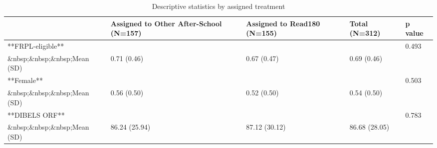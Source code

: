 \begin{table}

\caption{Descriptive statistics by assigned treatment \label{tab:descriptives}}
\centering
\begin{tabular}[t]{lllll}
\toprule
 & Assigned to Other After-School (N=157) & Assigned to Read180 (N=155) & Total (N=312) & p value\\
\midrule
**FRPL-eligible** &  &  &  & 0.493\\
\&nbsp;\&nbsp;\&nbsp;Mean (SD) & 0.71 (0.46) & 0.67 (0.47) & 0.69 (0.46) & \\
**Female** &  &  &  & 0.503\\
\&nbsp;\&nbsp;\&nbsp;Mean (SD) & 0.56 (0.50) & 0.52 (0.50) & 0.54 (0.50) & \\
**DIBELS ORF** &  &  &  & 0.783\\
\addlinespace
\&nbsp;\&nbsp;\&nbsp;Mean (SD) & 86.24 (25.94) & 87.12 (30.12) & 86.68 (28.05) & \\
\bottomrule
\end{tabular}
\end{table}
